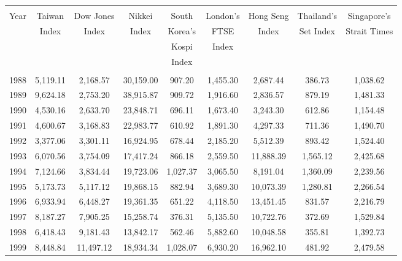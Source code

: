 \documentclass{ws-procs9x6}
\begin{document}
\begin{sidewaystable}	
{\begin{tabular}{@{}ccccccccc@{}}
\hline
\multicolumn{9}{c}{}\\[-2ex]
Year &Taiwan &Dow Jones &Nikkei &South &London's &Hong Seng &Thailand's
&Singapore's\\
{} &Index &Index &Index &Korea's &FTSE &Index &Set Index &Strait Times\\
{} &{} &{} &{} &Kospi &Index &{} &{} &{}\\
{} &{} &{} &{} &Index &{} &{} &{} &{}\\[0.25ex]
\hline
\multicolumn{9}{c}{}\\[-2ex]
1988 &5,119.11 &\phantom{0}2,168.57 &30,159.00 &907.20 &1,455.30
&\phantom{0}2,687.44 &386.73 &1,038.62\\ 
1989 &9,624.18 &\phantom{0}2,753.20 &38,915.87 &909.72 &1,916.60
&\phantom{0}2,836.57 &879.19 &1,481.33\\
1990 &4,530.16 &\phantom{0}2,633.70 &23,848.71 &696.11 &1,673.40
&\phantom{0}3,243.30 &612.86 &1,154.48\\
1991 &4,600.67 &\phantom{0}3,168.83 &22,983.77 &610.92 &1,891.30
&\phantom{0}4,297.33 &711.36 &1,490.70\\
1992 &3,377.06 &\phantom{0}3,301.11 &16,924.95 &678.44 &2,185.20
&\phantom{0}5,512.39 &893.42 &1,524.40\\
1993 &6,070.56 &\phantom{0}3,754.09 &17,417.24 &866.18 &2,559.50
&11,888.39 &1,565.12\phantom{0.} &2,425.68\\
1994 &7,124.66 &\phantom{0}3,834.44 &19,723.06 &1,027.37\phantom{0.}
&3,065.50 &\phantom{0}8,191.04 &1,360.09\phantom{0.} &2,239.56\\
1995 &5,173.73 &\phantom{0}5,117.12 &19,868.15 &882.94 &3,689.30
&10,073.39 &1,280.81\phantom{0.} &2,266.54\\
1996 &6,933.94 &\phantom{0}6,448.27 &19,361.35 &651.22 &4,118.50
&13,451.45 &831.57 &2,216.79\\
1997 &8,187.27 &\phantom{0}7,905.25 &15,258.74 &376.31 &5,135.50
&10,722.76 &372.69 &1,529.84\\
1998 &6,418.43 &\phantom{0}9,181.43 &13,842.17 &562.46 &5,882.60
&10,048.58 &355.81 &1,392.73\\
1999 &8,448.84 &11,497.12 &18,934.34 &1,028.07\phantom{0.} &6,930.20
&16,962.10 &481.92 &2,479.58\\

\end{tabular}}
\end{sidewaystable}
\end{document}
